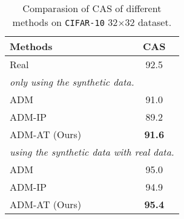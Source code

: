 \begin{table}[h]
\centering
\caption{Comparasion of CAS of different methods on \texttt{CIFAR-10} 32$\times$32 dataset.}
\begin{tabular}{lc}
\toprule
    Methods & CAS \\ 
    \midrule
    Real & 92.5 \\
    \midrule
    \multicolumn{2}{l}{\textit{only using the synthetic data.}} \\
    ADM & 91.0   \\
    ADM-IP & 89.2 \\
    ADM-AT (Ours) & \bf{91.6} \\
    \midrule
    \multicolumn{2}{l}{\textit{using the synthetic data with real data.}} \\
    ADM & 95.0   \\
    ADM-IP & 94.9 \\
    ADM-AT (Ours) & \bf{95.4} \\
    \bottomrule
    \end{tabular}
\label{tab:cas_results}
\end{table}